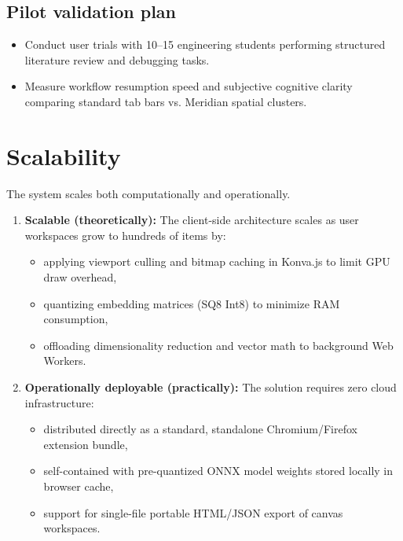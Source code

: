 \documentclass[11pt,a4paper]{article}
\begin{document}
\subsection{Pilot validation plan}
\begin{itemize}[leftmargin=0.7cm]
    \item Conduct user trials with 10--15 engineering students performing structured literature review and debugging tasks.
    \item Measure workflow resumption speed and subjective cognitive clarity comparing standard tab bars vs. Meridian spatial clusters.
\end{itemize}

\section{Scalability}
The system scales both computationally and operationally.

\begin{enumerate}[leftmargin=0.7cm]
    \item \textbf{Scalable (theoretically):} The client-side architecture scales as user workspaces grow to hundreds of items by:
    \begin{itemize}[leftmargin=0.7cm]
        \item applying viewport culling and bitmap caching in Konva.js to limit GPU draw overhead,
        \item quantizing embedding matrices (SQ8 Int8) to minimize RAM consumption,
        \item offloading dimensionality reduction and vector math to background Web Workers.
    \end{itemize}
    
    \item \textbf{Operationally deployable (practically):} The solution requires zero cloud infrastructure:
    \begin{itemize}[leftmargin=0.7cm]
        \item distributed directly as a standard, standalone Chromium/Firefox extension bundle,
        \item self-contained with pre-quantized ONNX model weights stored locally in browser cache,
        \item support for single-file portable HTML/JSON export of canvas workspaces.
    \end{itemize}
\end{enumerate}
\end{document}
